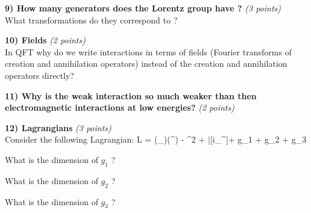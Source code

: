 {%

\textbf{9)  How many generators does the Lorentz group have ? }\hfill \textit{(3 points)}\\
What transformations do they correspond to ?

\vspace*{2in}

\textbf{10) Fields } \hfill \textit{(2 points)}\\
In QFT why do we write interactions in terms of fields (Fourier transforms of creation and annihilation operators)  instead  of the creation and annihilation operators directly?

\vspace*{2in}

\textbf{11) Why is the weak interaction so much weaker than then electromagnetic interactions at low energies? } \hfill \textit{(2 points)}\\

\clearpage


\textbf{12) Lagrangians } \hfill \textit{(3 points)}\\
Consider the following Lagrangian:
\be
L =  (\partial_\mu\phi)(\partial^\mu\phi) - \phi^2 + \bar{\psi}[i\gamma_\mu\partial^\mu]\psi + g_1 \phi \psi \psi + g_2 \psi \psi \psi \psi + g_3 \phi \phi \phi \phi
\ee

\bi
\item[a)] What is the dimension of $g_1$ ? 
\vspace*{1in}
\item[b)] What is the dimension of $g_2$ ? 
\vspace*{1in}
\item[c)] What is the dimension of $g_3$ ? 
\vspace*{1in}
\ei

\clearpage

}
